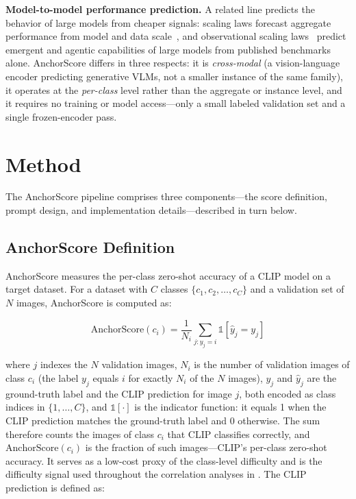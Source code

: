 \documentclass[a4paper,fleqn]{cas-sc}
\begin{document}
\textbf{Model-to-model performance prediction.} A related line predicts the behavior of large models from cheaper signals: scaling laws forecast aggregate performance from model and data scale~\cite{kaplan2020scaling,hoffmann2022training}, and observational scaling laws~\cite{ruan2024observational} predict emergent and agentic capabilities of large models from published benchmarks alone. AnchorScore differs in three respects: it is \emph{cross-modal} (a vision-language encoder predicting generative VLMs, not a smaller instance of the same family), it operates at the \emph{per-class} level rather than the aggregate or instance level, and it requires no training or model access---only a small labeled validation set and a single frozen-encoder pass.

\section{Method}
\label{sec:method}

The AnchorScore pipeline comprises three components---the score definition, prompt design, and implementation details---described in turn below.

\subsection{AnchorScore Definition}

AnchorScore measures the per-class zero-shot accuracy of a CLIP model on a target dataset. For a dataset with $C$ classes $\{c_1, c_2, \dots, c_C\}$ and a validation set of $N$ images, AnchorScore is computed as:

\begin{equation}
\text{AnchorScore}(c_i) = \frac{1}{N_i} \sum_{j : y_j = i} \mathbb{1}[\hat{y}_j = y_j]
\label{eq:anchorscore}
\end{equation}

where $j$ indexes the $N$ validation images, $N_i$ is the number of validation images of class $c_i$ (the label $y_j$ equals $i$ for exactly $N_i$ of the $N$ images), $y_j$ and $\hat{y}_j$ are the ground-truth label and the CLIP prediction for image $j$, both encoded as class indices in $\{1,\dots,C\}$, and $\mathbb{1}[\cdot]$ is the indicator function: it equals 1 when the CLIP prediction matches the ground-truth label and 0 otherwise. The sum therefore counts the images of class $c_i$ that CLIP classifies correctly, and $\text{AnchorScore}(c_i)$ is the fraction of such images---CLIP's per-class zero-shot accuracy. It serves as a low-cost proxy of the class-level difficulty and is the difficulty signal used throughout the correlation analyses in . The CLIP prediction is defined as:
\end{document}
